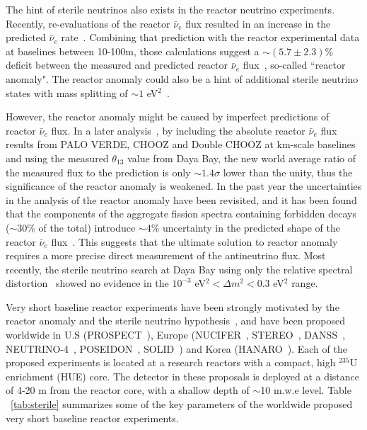 
The hint of sterile neutrinos also exists in the reactor neutrino experiments. Recently, re-evaluations of the reactor $\bar\nu_e$ flux 
resulted in an increase in the predicted $\bar\nu_e$ rate~\cite{Mueller2011, Huber2011}. Combining that  prediction with the reactor experimental data at baselines between 10-100m, those calculations suggest a $\sim(5.7\pm2.3)$\% 
deficit between the measured and predicted reactor $\bar\nu_e$ flux~\cite{Mention2011}, so-called ``reactor anomaly". The reactor anomaly could also be a hint of additional sterile neutrino states with mass splitting of $\sim1$ eV$^2$~\cite{Guinti2011}.

However, the reactor anomaly might be caused by imperfect predictions of reactor $\bar\nu_e$ flux. In a later analysis~\cite{Zhang13}, by including the absolute reactor $\bar\nu_e$ flux results from PALO VERDE, CHOOZ and Double CHOOZ at km-scale baselines and using the measured $\theta_{13}$ value from Daya Bay, the new world average ratio of the measured flux to the prediction is only $\sim1.4\sigma$ lower than the unity, thus the significance of the reactor anomaly is weakened. In the past year the uncertainties in the analysis of the reactor anomaly have been revisited, and it has been found that the components of the aggregate fission spectra containing forbidden decays 
($\sim30\%$ of the total) introduce $\sim$4\% uncertainty in the predicted shape of the reactor $\bar\nu_e$ flux~\cite{Hayes}. This suggests that the ultimate solution to reactor anomaly requires a more precise direct measurement of the antineutrino flux. Most recently, the sterile neutrino search at Daya Bay using only the relative spectral distortion~\cite{DayaBaySterile} showed no evidence in the $10^{-3}$ eV$^2<\Delta m^2<0.3$ eV$^2$ range.

Very short baseline reactor experiments have been strongly motivated by the reactor anomaly and the sterile neutrino hypothesis~\cite{sterileWP}, and 
have been proposed worldwide in U.S (PROSPECT~\cite{PROSPECT}), Europe (NUCIFER~\cite{NUCIFER-2010, NUCIFER-2014}, STEREO~\cite{NUCIFER-2014}, DANSS~\cite{DANSS}, NEUTRINO-4~\cite{NEUTRINO4-2012,NEUTRINO4-2014}, POSEIDON~\cite{POSEIDON}, SOLID~\cite{SoLid}) and Korea (HANARO~\cite{HANARO}). Each of the proposed experiments is located at a research reactors with a compact, high $^{235}$U enrichment (HUE) core. The detector in these proposals is deployed at a distance of 4-20 m from the reactor core, with a shallow depth of $\sim$10 m.w.e level. Table ~\ref{tab:sterile} summarizes some of the key parameters of the worldwide proposed very short baseline reactor experiments.

